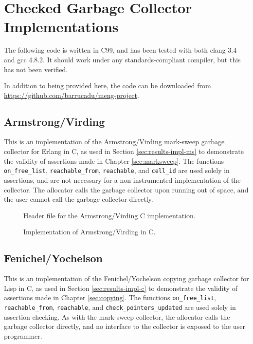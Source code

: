 \chapter{Checked Garbage Collector Implementations}
\label{sec:gc-impl}

\lstset{language=C}

The following code is written in C99, and has been tested with both
clang 3.4 and gcc 4.8.2. It should work under any standards-compliant
compiler, but this has not been verified.

In addition to being provided here, the code can be downloaded from
\url{https://github.com/barrucadu/meng-project}.

\section{Armstrong/Virding}
\label{sec:gc-impl-armstrong-virding}

This is an implementation of the Armstrong/Virding\cite{Armstrong95}
mark-sweep garbage collector for Erlang in C, as used in Section
\ref{sec:results-impl-ms} to demonstrate the validity of assertions
made in Chapter \ref{sec:marksweep}. The functions
\texttt{on\_free\_list}, \texttt{reachable\_from}, \texttt{reachable},
and \texttt{cell\_id} are used solely in assertions, and are not
necessary for a non-instrumented implementation of the collector. The
allocator calls the garbage collector upon running out of space, and
the user cannot call the garbage collector directly.


\begin{figure}[H]
  \captionsetup{format=default}
  \caption{Header file for the Armstrong/Virding C implementation.}
  \label{fig:armstrong-virding-h}
\end{figure}


\begin{figure}[H]
  \captionsetup{format=default}
  \caption{Implementation of Armstrong/Virding in C.}
  \label{fig:armstrong-virding-c}
\end{figure}

\vfill

\section{Fenichel/Yochelson}
\label{sec:gc-impl-fenichel-yochelson}

This is an implementation of the Fenichel/Yochelson\cite{Fenichel69}
copying garbage collector for Lisp in C, as used in Section
\ref{sec:results-impl-c} to demonstrate the validity of assertions
made in Chapter \ref{sec:copying}. The functions
\texttt{on\_free\_list}, \texttt{reachable\_from}, \texttt{reachable},
and \texttt{check\_pointers\_updated} are used solely in assertion
checking. As with the mark-sweep collector, the allocator calls the
garbage collector directly, and no interface to the collector is
exposed to the user programmer.

